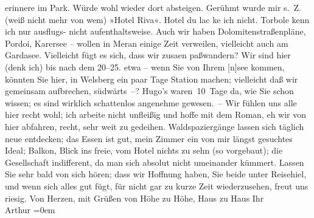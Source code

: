 \begin{ledgroupsized}[t]{13cm}
               erinnere im Park. Würde wohl wieder dort absteigen. Gerühmt wurde mir s. Z. (weiß
               nicht mehr von wem) »Hotel Riva«. Hotel du lac ke{\geminationn}
               ich nicht. Torbole kenn ich nur ausflugs- nicht
               aufenthaltsweise.\pend
           \pstart
           Auch wir haben Dolomitenstraßenpläne, Pordoi, Karersee – wollen in Meran einige Zeit
               verweilen, vielleicht auch am Gardasee.
               Vielleicht fügt es sich, dass wir zusa{\geminationm}en paßwandern?
               Wir sind hier (denk ich) bis nach dem 20–25. etwa – wenn
               Sie von Ihrem {[}n{]}see
               kommen, könnten Sie hier, in Welsberg ein paar
               Tage {\pb}Station machen; vielleicht daß wir gemeinsam
               aufbrechen, südwärts –?\pend
           \pstart
           Hugo’s waren 10 Tage da, wie Sie
               schon wissen; es sind wirklich schattenlos angenehme gewesen. – Wir fühlen uns alle
               hier recht wohl; ich arbeite nicht unfleißig und hoffe mit dem Roman, eh wir von hier abfahren, recht,
               sehr weit zu gedeihen. Waldspaziergänge lassen sich täglich neue entdecken; das Essen
               ist gut, mein Zimmer ein von mir längst gesuchtes Ideal; Balkon, Blick ins freie, vom
               Hotel nichts zu sehn (so vorgebaut); die Gesellschaft indifferent, da man sich
               absolut nicht umeinander kümmert.\pend
           \pstart
           Lassen Sie sehr bald von sich hören; dass wir Hoffnung haben, Sie beide unter
                  Reisehi{\geminationm}el, und wenn sich alles gut fügt, für nicht
               gar zu kurze Zeit wiederzusehen, freut uns riesig.\pend
           \pstart
           Von Herzen, mit Grüßen von Höhe zu Höhe, Haus zu Haus\pend
           \pstart
           Ihr{\\[\baselineskip]}\spacefill\mbox{Arthur}\pend
           \leftskip=0em{}
         
         \endnumbering{}\end{ledgroupsized}  \newcommand{\dateiname}{L01695}\newcommand{\titel}{Arthur Schnitzler an Richard Beer-Hofmann, 29. 7. 1907}\newcommand{\editorInnen}{Martin Anton Müller und Gerd-Hermann Susen}
      